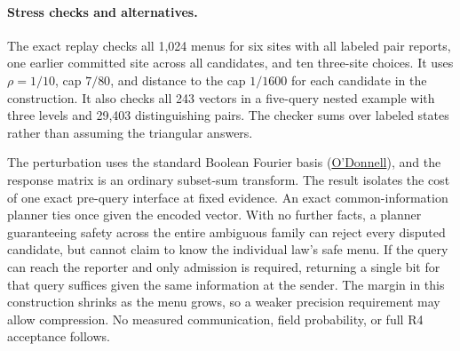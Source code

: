 \documentclass{article}
\begin{document}
\paragraph{Stress checks and alternatives.}
The exact replay checks all 1,024 menus for six sites with
all labeled pair reports, one earlier committed site across
all candidates, and ten three-site choices. It uses
\(\rho=1/10\), cap \(7/80\), and distance to the cap
\(1/1600\) for each candidate in the construction. It also
checks all 243 vectors in a five-query nested example with
three levels and 29,403 distinguishing pairs. The checker
sums over labeled states rather than assuming the triangular
answers.

The perturbation uses the standard Boolean Fourier basis
(\href{https://www.cs.cmu.edu/~odonnell/papers/analysis-survey.pdf}{O'Donnell}),
and the response matrix is an ordinary subset-sum transform.
The result isolates the cost of one exact pre-query interface
at fixed evidence. An exact common-information planner ties
once given the encoded vector. With no further facts, a
planner guaranteeing safety across the entire ambiguous family
can reject every disputed candidate, but cannot claim to know
the individual law's safe menu. If the query can reach the
reporter and only admission is required, returning a single
bit for that query suffices given the same information at
the sender. The margin in this construction shrinks as the
menu grows, so a weaker precision requirement may allow
compression. No measured communication, field probability,
or full R4 acceptance follows.
\end{document}
